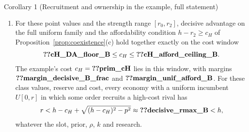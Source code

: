 \begin{named}{Corollary 1 (Recruitment and ownership in the example, full statement)}
\begin{enumerate}[label=(\alph*),leftmargin=2em]
\(\reg{entry_r0}\), \(\reg{entry_r1_B}\), \(\reg{entry_r2}\), and high-class ownership is
\(\reg{own_r0}\), \(\reg{own_r1_B}\), \(\reg{own_r0}\). Class \(H\)'s share of acquisitions won by the rival
is respectively \(\reg{share_H_r0}\), \(\reg{share_H_r1_B}\), \(\reg{share_H_r2_B}\).
\item For these point values and the strength range \([r_0,r_2]\), decisive advantage on the full uniform family
and the affordability condition \(h-r_2\ge c_H\) of Proposition~\ref{prop:coexistence}(c) hold together exactly
on the cost window
\[
\reg{cH_DA_floor_B}\le c_H\le\reg{cH_afford_ceiling_B}.
\]
The example's cost \(c_H=\reg{prim_cH}\) lies in this window, with margins
\(\reg{margin_decisive_B_frac}\) and \(\reg{margin_unif_afford_B}\). For these class values, reserve and cost,
every economy with a uniform incumbent \(U[0,r]\) in which some order recruits a high-cost rival has
\[
r< h-c_H+\sqrt{(h-c_H)^2-p^2}\approx\reg{decisive_rmax_B}<h,
\]
whatever the slot, prior, \(\rho\), \(k\) and research.
\end{enumerate}
\end{named}


